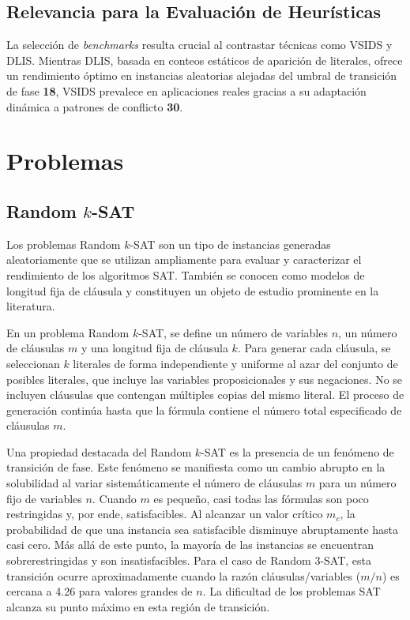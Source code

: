 \subsection{Relevancia para la Evaluación de Heurísticas}
La selección de \textit{benchmarks} resulta crucial al contrastar técnicas como VSIDS y DLIS. Mientras DLIS, basada en conteos estáticos de aparición de literales, ofrece un rendimiento óptimo en instancias aleatorias alejadas del umbral de transición de fase \textbf{18}, VSIDS prevalece en aplicaciones reales gracias a su adaptación dinámica a patrones de conflicto \textbf{30}.

\section{Problemas}
\label{sec:problemas-ej}

\subsection{Random $k$-SAT}
\label{subsec:random-k-sat}
Los problemas Random $k$-SAT son un tipo de instancias generadas aleatoriamente que se utilizan ampliamente para evaluar y caracterizar el rendimiento de los algoritmos SAT. También se conocen como modelos de longitud fija de cláusula y constituyen un objeto de estudio prominente en la literatura. %

En un problema Random $k$-SAT, se define un número de variables $n$, un número de cláusulas $m$ y una longitud fija de cláusula $k$. Para generar cada cláusula, se seleccionan $k$ literales de forma independiente y uniforme al azar del conjunto de posibles literales, que incluye las variables proposicionales y sus negaciones. No se incluyen cláusulas que contengan múltiples copias del mismo literal. El proceso de generación continúa hasta que la fórmula contiene el número total especificado de cláusulas $m$. %

Una propiedad destacada del Random $k$-SAT es la presencia de un fenómeno de transición de fase. Este fenómeno se manifiesta como un cambio abrupto en la solubilidad al variar sistemáticamente el número de cláusulas $m$ para un número fijo de variables $n$. Cuando $m$ es pequeño, casi todas las fórmulas son poco restringidas y, por ende, satisfacibles. Al alcanzar un valor crítico $m_c$, la probabilidad de que una instancia sea satisfacible disminuye abruptamente hasta casi cero. Más allá de este punto, la mayoría de las instancias se encuentran sobre\-restringidas y son insatisfacibles. Para el caso de Random 3-SAT, esta transición ocurre aproximadamente cuando la razón cláusulas/variables ($m/n$) es cercana a 4.26 para valores grandes de $n$. La dificultad de los problemas SAT alcanza su punto máximo en esta región de transición. %

